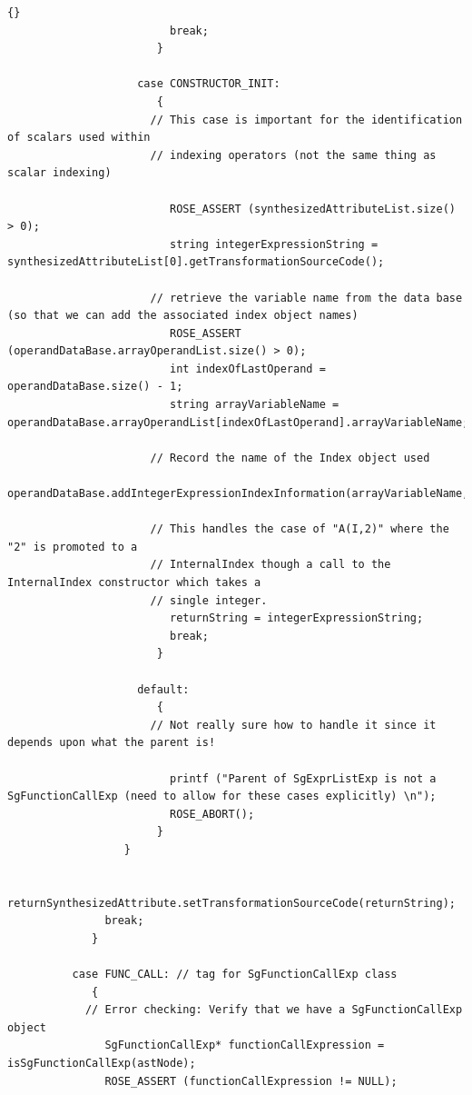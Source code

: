 \documentclass[10pt]{article}
\begin{document}
{\begin{lstlisting}{}
                         break;
                       }

                    case CONSTRUCTOR_INIT:
                       {
                      // This case is important for the identification of scalars used within
                      // indexing operators (not the same thing as scalar indexing)

                         ROSE_ASSERT (synthesizedAttributeList.size() > 0);
                         string integerExpressionString = synthesizedAttributeList[0].getTransformationSourceCode();

                      // retrieve the variable name from the data base (so that we can add the associated index object names)
                         ROSE_ASSERT (operandDataBase.arrayOperandList.size() > 0);
                         int indexOfLastOperand = operandDataBase.size() - 1;
                         string arrayVariableName = operandDataBase.arrayOperandList[indexOfLastOperand].arrayVariableName;

                      // Record the name of the Index object used
                         operandDataBase.addIntegerExpressionIndexInformation(arrayVariableName,integerExpressionString);

                      // This handles the case of "A(I,2)" where the "2" is promoted to a
                      // InternalIndex though a call to the InternalIndex constructor which takes a
                      // single integer.
                         returnString = integerExpressionString;
                         break;
                       }

                    default:
                       {
                      // Not really sure how to handle it since it depends upon what the parent is!

                         printf ("Parent of SgExprListExp is not a SgFunctionCallExp (need to allow for these cases explicitly) \n");
                         ROSE_ABORT();
                       }
                  }

               returnSynthesizedAttribute.setTransformationSourceCode(returnString);
               break;
             }

          case FUNC_CALL: // tag for SgFunctionCallExp class
             {
            // Error checking: Verify that we have a SgFunctionCallExp object
               SgFunctionCallExp* functionCallExpression = isSgFunctionCallExp(astNode);
               ROSE_ASSERT (functionCallExpression != NULL);


\end{lstlisting}}
\end{document}
